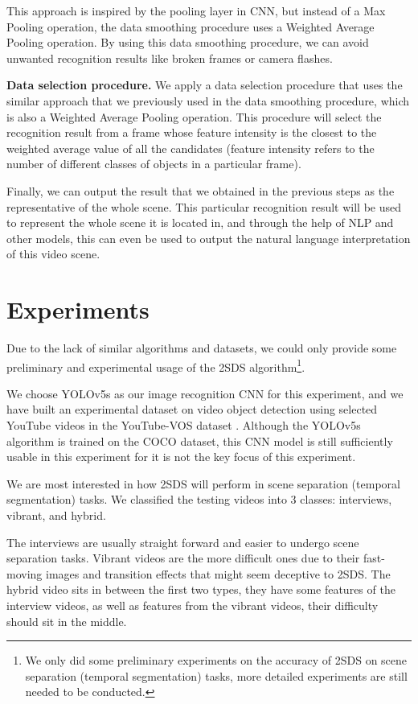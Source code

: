 \documentclass[
twocolumn,
]{ceurart}
\begin{document}
This approach is inspired by the pooling layer in CNN, but instead of a Max Pooling operation, the data smoothing procedure uses a Weighted Average Pooling operation. By using this data smoothing procedure, we can avoid unwanted recognition results like broken frames or camera flashes.

\textbf{Data selection procedure.} We apply a data selection procedure that uses the similar approach that we previously used in the data smoothing procedure, which is also a Weighted Average Pooling operation. This procedure will select the recognition result from a frame whose feature intensity is the closest to the weighted average value of all the candidates (feature intensity refers to the number of different classes of objects in a particular frame).

Finally, we can output the result that we obtained in the previous steps as the representative of the whole scene. This particular recognition result will be used to represent the whole scene it is located in, and through the help of NLP and other models, this can even be used to output the natural language interpretation of this video scene.

\section{Experiments}
Due to the lack of similar algorithms and datasets, we could only provide some preliminary and experimental usage of the 2SDS algorithm\footnote{We only did some preliminary experiments on the accuracy of 2SDS on scene separation (temporal segmentation) tasks, more detailed experiments are still needed to be conducted.}.

We choose YOLOv5s as our image recognition CNN for this experiment, and we have built an experimental dataset on video object detection using selected YouTube videos in the YouTube-VOS dataset \cite{DBLP:journals/corr/abs-1809-03327}. Although the YOLOv5s algorithm is trained on the COCO dataset, this CNN model is still sufficiently usable in this experiment for it is not the key focus of this experiment.

We are most interested in how 2SDS will perform in scene separation (temporal segmentation) tasks. We classified the testing videos into 3 classes: interviews, vibrant, and hybrid. 

The interviews are usually straight forward and easier to undergo scene separation tasks. Vibrant videos are the more difficult ones due to their fast-moving images and transition effects that might seem deceptive to 2SDS. The hybrid video sits in between the first two types, they have some features of the interview videos, as well as features from the vibrant videos, their difficulty should sit in the middle.
\end{document}
